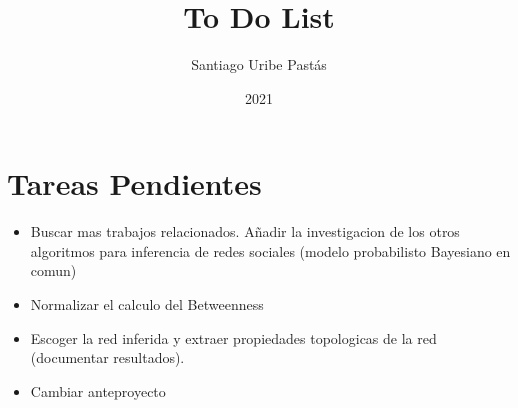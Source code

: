 \documentclass{article}
\title{To Do List}
\author{Santiago Uribe Pastás}
\date{2021}
\begin{document}
\maketitle

\section{Tareas Pendientes}
\begin{itemize}
    \item Buscar mas trabajos relacionados. Añadir la investigacion de los otros algoritmos para inferencia de redes sociales (modelo probabilisto Bayesiano en comun)
    \item Normalizar el calculo del Betweenness
    \item Escoger la red inferida y extraer propiedades topologicas de la red (documentar resultados).
    \item Cambiar anteproyecto
\end{itemize}
\end{document}

